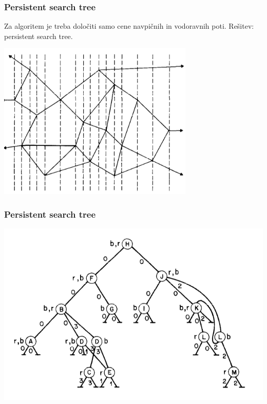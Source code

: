 \documentclass{beamer}
\begin{document}
\begin{frame}
    \frametitle{Persistent search tree}

    Za algoritem je treba določiti samo cene navpičnih in vodoravnih poti. Rešitev: persistent search tree.

    \includegraphics[width=0.7\textwidth]{slabs.png}
    
\end{frame}

\begin{frame}
    \frametitle{Persistent search tree}

    \includegraphics[width=1\textwidth]{psTree.png}

\end{frame}
\end{document}
